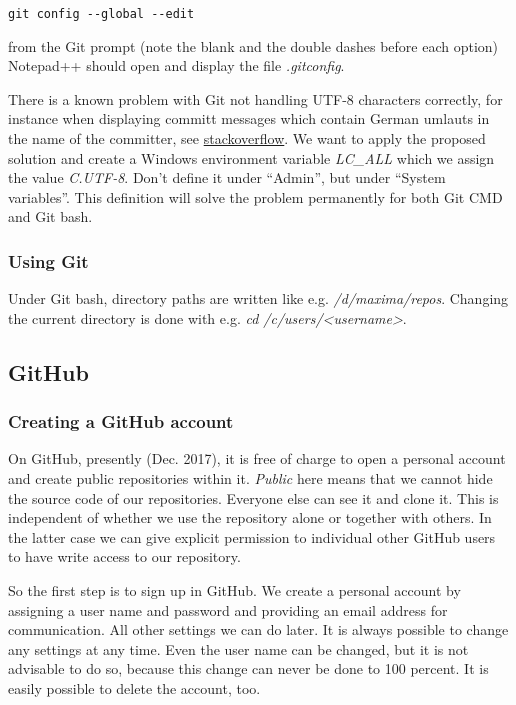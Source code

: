 \documentclass[../Maxima_Workbook.tex]{subfiles}
\begin{document}
\begin{lstlisting}[style=smallblue]
git config --global --edit
\end{lstlisting}

from the Git prompt (note the blank and the double dashes before each option) Notepad++ should open and display the file \emph{.gitconfig}.

\lz There is a known problem with Git not handling UTF-8 characters correctly, for instance when displaying committ messages which contain German umlauts in the name of the committer, see \href{https://stackoverflow.com/questions/41139067/git-log-output-encoding-issues-on-windows-10-command-prompt}{stackoverflow}. We want to apply the proposed solution and create a Windows environment variable \emph{LC\_ALL} which we assign the value \emph{C.UTF-8}. Don't define it under "`Admin"', but under "`System variables"'. This definition will solve the problem permanently for both Git CMD and Git bash.

\subsubsection{Using Git}

Under Git bash, directory paths are written like e.g. \emph{/d/maxima/repos}. Changing the current directory is done with e.g. \emph{cd /c/users/<username>}.

\subsection{GitHub}

\subsubsection{Creating a GitHub account}

On GitHub, presently (Dec. 2017), it is free of charge to open a personal account and create public repositories within it. \emph{Public} here means that we cannot hide the source code of our repositories. Everyone else can see it and clone it. This is independent of whether we use the repository alone or together with others. In the latter case we can give explicit permission to individual other GitHub users to have write access to our repository.

\lz So the first step is to sign up in GitHub. We create a personal account by assigning a user name and password and providing an email address for communication. All other settings we can do later. It is always possible to change any settings at any time. Even the user name can be changed, but it is not advisable to do so, because this change can never be done to 100 percent. It is easily possible to delete the account, too.
\end{document}
